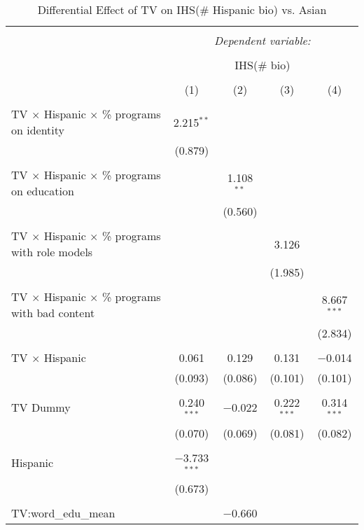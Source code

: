 
\begin{table}[!htbp] \centering 
  \caption{Differential Effect of TV on IHS(\# Hispanic bio) vs. Asian} 
  \label{} 
\begin{tabular}{@{\extracolsep{-2pt}}lcccc} 
\\[-1.8ex]\hline 
\hline \\[-1.8ex] 
 & \multicolumn{4}{c}{\textit{Dependent variable:}} \\ 
\cline{2-5} 
\\[-1.8ex] & \multicolumn{4}{c}{IHS(\# bio)} \\ 
\\[-1.8ex] & (1) & (2) & (3) & (4)\\ 
\hline \\[-1.8ex] 
 TV $\times$ Hispanic $\times$ \% programs on identity & 2.215$^{**}$ &  &  &  \\ 
  & (0.879) &  &  &  \\ 
  & & & & \\ 
 TV $\times$ Hispanic $\times$ \% programs on education &  & 1.108$^{**}$ &  &  \\ 
  &  & (0.560) &  &  \\ 
  & & & & \\ 
 TV $\times$ Hispanic $\times$ \% programs with role models &  &  & 3.126 &  \\ 
  &  &  & (1.985) &  \\ 
  & & & & \\ 
 TV $\times$ Hispanic $\times$ \% programs with bad content &  &  &  & 8.667$^{***}$ \\ 
  &  &  &  & (2.834) \\ 
  & & & & \\ 
 TV $\times$ Hispanic & 0.061 & 0.129 & 0.131 & $-$0.014 \\ 
  & (0.093) & (0.086) & (0.101) & (0.101) \\ 
  & & & & \\ 
 TV Dummy & 0.240$^{***}$ & $-$0.022 & 0.222$^{***}$ & 0.314$^{***}$ \\ 
  & (0.070) & (0.069) & (0.081) & (0.082) \\ 
  & & & & \\ 
 Hispanic & $-$3.733$^{***}$ &  &  &  \\ 
  & (0.673) &  &  &  \\ 
  & & & & \\ 
 TV:word\_edu\_mean &  & $-$0.660 &  &  \\ 

\end{tabular}
\end{table}
